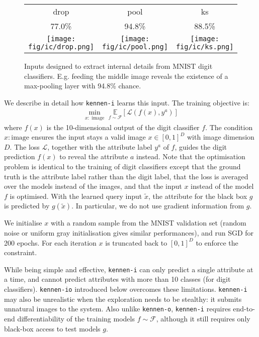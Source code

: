 \documentclass{article} %
\newcommand{\OR}{\texttt{kennen-o}\xspace}
\newcommand{\IC}{\texttt{kennen-i}\xspace}
\newcommand{\ORIC}{\texttt{kennen-io}\xspace}
\begin{document}
\begin{wrapfigure}{r}{0.5\columnwidth}
\vspace{-2em}
\begin{centering}
\setlength{\tabcolsep}{0.2em}
\begin{tabular}{ccc}
drop & pool & ks \tabularnewline
77.0\% & 94.8\% & 88.5\% \tabularnewline
\texttt{[image: fig/ic/drop.png]}
 & 
\texttt{[image: fig/ic/pool.png]}
 & 
\texttt{[image: fig/ic/ks.png]}
\end{tabular}
\par\end{centering}
\vspace{-1em}
\caption{\label{fig:mnist-ic}Inputs designed to extract internal details from MNIST digit classifiers. E.g. feeding the middle image reveals the existence of a max-pooling layer with 94.8\% chance.}
\vspace{-1em}
\end{wrapfigure}
We describe in detail how \IC learns this input. The training objective is:
\begin{align}
\label{eq:ic}
\underset{x:\text{ image}}{\min}\,\,\underset{f\sim \mathcal{F}}{\mathbb{E}}\left[\mathcal{L}\left(f(x),y^a\right)\right]
\end{align}
where $f(x)$ is the 10-dimensional output of the digit classifier $f$. The condition $x:\text{image}$ ensures the input stays a valid image $x\in [0,1]^{D}$ with image dimension $D$. The loss $\mathcal{L}$, together with the attribute label $y^a$ of $f$, guides the digit prediction $f(x)$ to reveal the attribute $a$ instead. Note that the optimisation problem is identical to the training of digit classifiers except that the ground truth is the attribute label rather than the digit label, that the loss is averaged over the models instead of the images, and that the input $x$ instead of the model $f$ is optimised. With the learned query input $\tilde{x}$, the attribute for the black box $g$ is predicted by $g(\tilde{x})$. In particular, we do not use gradient information from $g$.

We initialise $x$ with a random sample from the MNIST validation set (random noise or uniform gray initialisation gives similar performances), and run SGD for 200 epochs. For each iteration $x$ is truncated back to $[0,1]^{D}$ to enforce the constraint.

While being simple and effective, \IC can only predict a single attribute at a time, and cannot predict attributes with more than 10 classes (for digit classifiers). \ORIC introduced below overcomes these limitations. \IC may also be unrealistic when the exploration needs to be stealthy: it submits unnatural images to the system. Also unlike \OR, \IC requires end-to-end differentiability of the training models $f\sim\mathcal{F}$, although it still requires only black-box access to test models $g$. 
\end{document}
